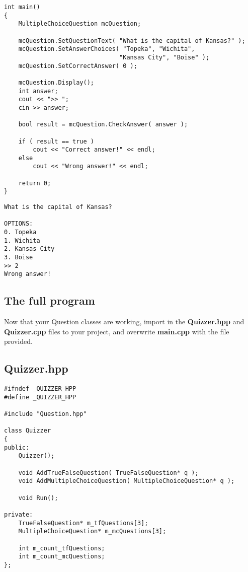 \documentclass[a4paper,12pt]{book}
\begin{document}
                    \newpage
\begin{lstlisting}[style=code]
int main()
{
    MultipleChoiceQuestion mcQuestion;

    mcQuestion.SetQuestionText( "What is the capital of Kansas?" );
    mcQuestion.SetAnswerChoices( "Topeka", "Wichita",
                                "Kansas City", "Boise" );
    mcQuestion.SetCorrectAnswer( 0 );

    mcQuestion.Display();
    int answer;
    cout << ">> ";
    cin >> answer;

    bool result = mcQuestion.CheckAnswer( answer );

    if ( result == true )
        cout << "Correct answer!" << endl;
    else
        cout << "Wrong answer!" << endl;

    return 0;
}
\end{lstlisting}

\begin{lstlisting}[style=output]
What is the capital of Kansas?

OPTIONS:
0. Topeka
1. Wichita
2. Kansas City
3. Boise
>> 2
Wrong answer!

\end{lstlisting}
                    
            \newpage{}
            \subsection*{The full program}

                Now that your Question classes are working,
                import in the \textbf{ Quizzer.hpp } and \textbf{ Quizzer.cpp }
                files to your project, and overwrite \textbf{ main.cpp }
                with the file provided.


            \subsection*{Quizzer.hpp}
\begin{lstlisting}[style=code]
#ifndef _QUIZZER_HPP
#define _QUIZZER_HPP

#include "Question.hpp"

class Quizzer
{
public:
    Quizzer();

    void AddTrueFalseQuestion( TrueFalseQuestion* q );
    void AddMultipleChoiceQuestion( MultipleChoiceQuestion* q );

    void Run();

private:
    TrueFalseQuestion* m_tfQuestions[3];
    MultipleChoiceQuestion* m_mcQuestions[3];

    int m_count_tfQuestions;
    int m_count_mcQuestions;
};
\end{lstlisting}
\end{document}
